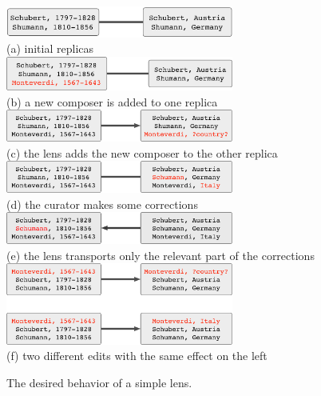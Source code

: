 \begin{figure}
    \begin{center}
        \vspace*{-2ex}
        \includegraphics[width=75mm]{images/ex1-init.pdf} \\
        (a) initial replicas \\[1.5ex]
        \includegraphics[width=75mm]{images/ex1-1.pdf} \\
        (b) a new composer is added to one replica \\[1.5ex]
        \includegraphics[width=75mm]{images/ex1-2.pdf} \\
        (c) the lens adds the new composer to the other replica \\[1.5ex]
        \includegraphics[width=75mm]{images/ex1-3.pdf} \\
        (d) the curator makes some corrections \\[1.5ex]
        \includegraphics[width=75mm]{images/ex1-4.pdf} \\
        (e) the lens transports only the relevant part of the corrections \\[1.5ex]
        \includegraphics[width=75mm]{images/ex1-5.pdf} \\
        (f) two different edits with the same effect on the left
    \end{center}
    \caption{The desired behavior of a simple lens.}
    \label{fig:example-simple}
\end{figure}

